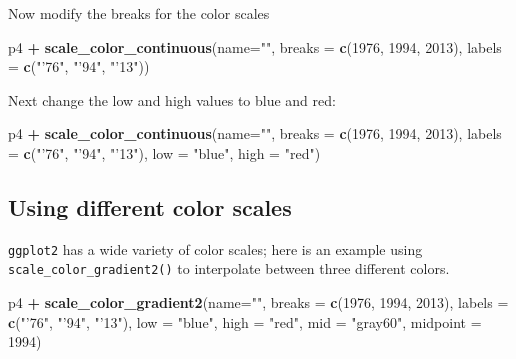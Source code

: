 \documentclass[
]{book}
\newenvironment{Shaded}{\begin{snugshade}}{\end{snugshade}}
\newcommand{\DataTypeTok}[1]{\textcolor[rgb]{0.13,0.29,0.53}{#1}}
\newcommand{\DecValTok}[1]{\textcolor[rgb]{0.00,0.00,0.81}{#1}}
\newcommand{\KeywordTok}[1]{\textcolor[rgb]{0.13,0.29,0.53}{\textbf{#1}}}
\newcommand{\NormalTok}[1]{#1}
\newcommand{\OperatorTok}[1]{\textcolor[rgb]{0.81,0.36,0.00}{\textbf{#1}}}
\newcommand{\StringTok}[1]{\textcolor[rgb]{0.31,0.60,0.02}{#1}}
\begin{document}
Now modify the breaks for the color scales

\begin{Shaded}
\begin{Highlighting}[]
\NormalTok{p4 }\OperatorTok{+}\StringTok{ }
\StringTok{  }\KeywordTok{scale_color_continuous}\NormalTok{(}\DataTypeTok{name=}\StringTok{""}\NormalTok{,}
                         \DataTypeTok{breaks =} \KeywordTok{c}\NormalTok{(}\DecValTok{1976}\NormalTok{, }\DecValTok{1994}\NormalTok{, }\DecValTok{2013}\NormalTok{),}
                         \DataTypeTok{labels =} \KeywordTok{c}\NormalTok{(}\StringTok{"'76"}\NormalTok{, }\StringTok{"'94"}\NormalTok{, }\StringTok{"'13"}\NormalTok{))}
\end{Highlighting}
\end{Shaded}

Next change the low and high values to blue and red:

\begin{Shaded}
\begin{Highlighting}[]
\NormalTok{p4 }\OperatorTok{+}
\StringTok{  }\KeywordTok{scale_color_continuous}\NormalTok{(}\DataTypeTok{name=}\StringTok{""}\NormalTok{,}
                         \DataTypeTok{breaks =} \KeywordTok{c}\NormalTok{(}\DecValTok{1976}\NormalTok{, }\DecValTok{1994}\NormalTok{, }\DecValTok{2013}\NormalTok{),}
                         \DataTypeTok{labels =} \KeywordTok{c}\NormalTok{(}\StringTok{"'76"}\NormalTok{, }\StringTok{"'94"}\NormalTok{, }\StringTok{"'13"}\NormalTok{),}
                         \DataTypeTok{low =} \StringTok{"blue"}\NormalTok{, }\DataTypeTok{high =} \StringTok{"red"}\NormalTok{)}
\end{Highlighting}
\end{Shaded}

\hypertarget{using-different-color-scales}{%
\subsection{Using different color scales}\label{using-different-color-scales}}

\texttt{ggplot2} has a wide variety of color scales; here is an example using \texttt{scale\_color\_gradient2()} to interpolate between three different colors.

\begin{Shaded}
\begin{Highlighting}[]
\NormalTok{p4 }\OperatorTok{+}
\StringTok{  }\KeywordTok{scale_color_gradient2}\NormalTok{(}\DataTypeTok{name=}\StringTok{""}\NormalTok{,}
                        \DataTypeTok{breaks =} \KeywordTok{c}\NormalTok{(}\DecValTok{1976}\NormalTok{, }\DecValTok{1994}\NormalTok{, }\DecValTok{2013}\NormalTok{),}
                        \DataTypeTok{labels =} \KeywordTok{c}\NormalTok{(}\StringTok{"'76"}\NormalTok{, }\StringTok{"'94"}\NormalTok{, }\StringTok{"'13"}\NormalTok{),}
                        \DataTypeTok{low =} \StringTok{"blue"}\NormalTok{,}
                        \DataTypeTok{high =} \StringTok{"red"}\NormalTok{,}
                        \DataTypeTok{mid =} \StringTok{"gray60"}\NormalTok{,}
                        \DataTypeTok{midpoint =} \DecValTok{1994}\NormalTok{)}
\end{Highlighting}
\end{Shaded}
\end{document}
